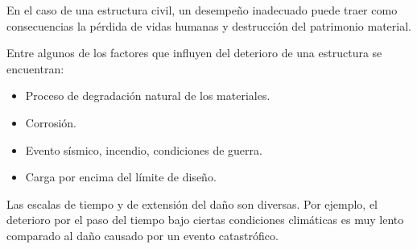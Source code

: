 En el caso de una estructura civil, un desempeño inadecuado puede traer como consecuencias la pérdida de vidas humanas y destrucción del patrimonio material.

Entre algunos de los factores que influyen del deterioro de una estructura se encuentran:
    
        \begin{itemize}
            \item Proceso de degradación natural de los materiales.
            \item Corrosión.
            \item Evento sísmico, incendio, condiciones de guerra.
            \item Carga por encima del límite de diseño.
        \end{itemize}
    
Las escalas de tiempo y de extensión del daño son diversas. Por ejemplo, el deterioro por el paso del tiempo bajo ciertas condiciones climáticas es muy lento comparado al daño causado por un evento catastrófico.

